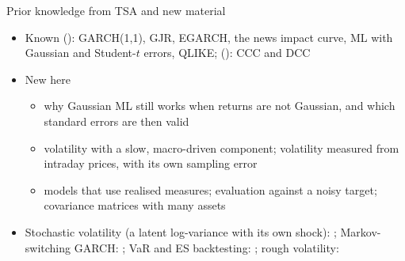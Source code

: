 \begin{frame}{Prior knowledge from TSA and new material}
\itemsize{\small}
\begin{itemize}
    \item Known (): GARCH(1,1), GJR, EGARCH, the news impact curve, ML with Gaussian and Student-$t$ errors, QLIKE; (): CCC and DCC
    \item New here
    \begin{itemize}
        \item why Gaussian ML still works when returns are not Gaussian, and which standard errors are then valid
        \item volatility with a slow, macro-driven component; volatility measured from intraday prices, with its own sampling error
        \item models that use realised measures; evaluation against a noisy target; covariance matrices with many assets
    \end{itemize}
    \item Stochastic volatility (a latent log-variance with its own shock): ; Markov-switching GARCH: ; VaR and ES backtesting: ; rough volatility: 
\end{itemize}
\end{frame}

